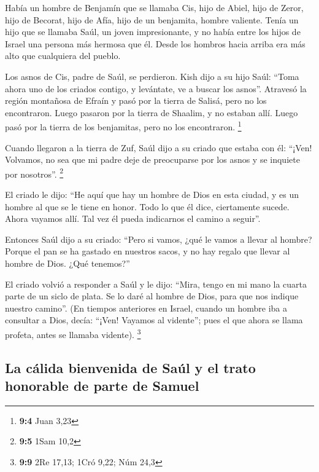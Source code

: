 \begin{paracol}{2}
 Había un hombre de Benjamín que se llamaba Cis, hijo de
Abiel, hijo de Zeror, hijo de Becorat, hijo de Afía, hijo de un
benjamita, hombre valiente.  Tenía un hijo que se llamaba
Saúl, un joven impresionante, y no había entre los hijos de Israel una
persona más hermosa que él. Desde los hombros hacia arriba era más alto
que cualquiera del pueblo.

 Los asnos de Cis, padre de Saúl, se perdieron. Kish dijo
a su hijo Saúl: ``Toma ahora uno de los criados contigo, y levántate, ve
a buscar los asnos''.  Atravesó la región montañosa de
Efraín y pasó por la tierra de Salisá, pero no los encontraron. Luego
pasaron por la tierra de Shaalim, y no estaban allí. Luego pasó por la
tierra de los benjamitas, pero no los encontraron. \footnote{\textbf{9:4}
  Juan 3,23}

 Cuando llegaron a la tierra de Zuf, Saúl dijo a su criado
que estaba con él: ``¡Ven! Volvamos, no sea que mi padre deje de
preocuparse por los asnos y se inquiete por nosotros''. \footnote{\textbf{9:5}
  1Sam 10,2}

 El criado le dijo: ``He aquí que hay un hombre de Dios en
esta ciudad, y es un hombre al que se le tiene en honor. Todo lo que él
dice, ciertamente sucede. Ahora vayamos allí. Tal vez él pueda
indicarnos el camino a seguir''.

 Entonces Saúl dijo a su criado: ``Pero si vamos, ¿qué le
vamos a llevar al hombre? Porque el pan se ha gastado en nuestros sacos,
y no hay regalo que llevar al hombre de Dios. ¿Qué tenemos?''

 El criado volvió a responder a Saúl y le dijo: ``Mira,
tengo en mi mano la cuarta parte de un siclo de plata. Se lo daré al
hombre de Dios, para que nos indique nuestro camino''. 
(En tiempos anteriores en Israel, cuando un hombre iba a consultar a
Dios, decía: ``¡Ven! Vayamos al vidente''; pues el que ahora se llama
profeta, antes se llamaba vidente). \footnote{\textbf{9:9} 2Re 17,13;
  1Cró 9,22; Núm 24,3}

\hypertarget{la-cuxe1lida-bienvenida-de-sauxfal-y-el-trato-honorable-de-parte-de-samuel}{%
\subsection{La cálida bienvenida de Saúl y el trato honorable de parte
de
Samuel}\label{la-cuxe1lida-bienvenida-de-sauxfal-y-el-trato-honorable-de-parte-de-samuel}}


\end{paracol}
